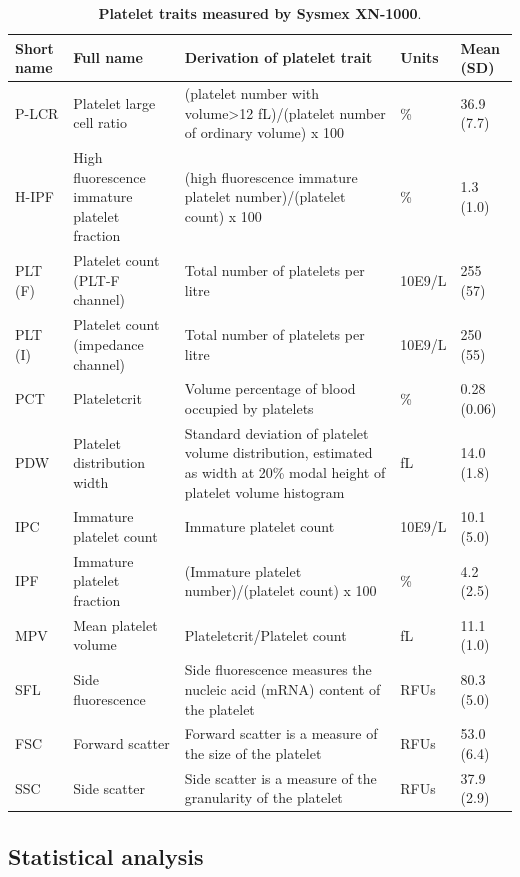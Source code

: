 \documentclass[11pt,twoside]{bristolthesis}
\begin{document}
\begin{landscape}\begin{table}

\caption[Platelet traits measured by Sysmex XN-1000]{\label{tab:Platelet-traits}\textbf{Platelet traits measured by Sysmex XN-1000}.}
\centering
\begin{tabu} to 
\toprule
Short name & Full name & Derivation of platelet trait & Units & Mean (SD)\\
\midrule
P-LCR & Platelet large cell ratio & (platelet number with volume>12 fL)/(platelet number of ordinary volume)  x 100 & \% & 36.9 (7.7)\\
H-IPF & High fluorescence immature platelet fraction & (high fluorescence immature platelet number)/(platelet count)  x 100 & \% & 1.3 (1.0)\\
PLT (F) & Platelet count (PLT-F channel) & Total number of platelets per litre & 10E9/L & 255 (57)\\
PLT (I) & Platelet count (impedance channel) & Total number of platelets per litre & 10E9/L & 250 (55)\\
PCT & Plateletcrit & Volume percentage of blood occupied by platelets & \% & 0.28 (0.06)\\
\addlinespace
PDW & Platelet distribution width & Standard deviation of platelet volume distribution, estimated as width at 20\% modal height of platelet volume histogram & fL & 14.0 (1.8)\\
IPC & Immature platelet count & Immature platelet count & 10E9/L & 10.1 (5.0)\\
IPF & Immature platelet fraction & (Immature platelet number)/(platelet count)   x 100 & \% & 4.2 (2.5)\\
MPV & Mean platelet volume & Plateletcrit/Platelet count & fL & 11.1 (1.0)\\
SFL & Side fluorescence & Side fluorescence measures the nucleic acid (mRNA) content of the platelet & RFUs & 80.3 (5.0)\\
\addlinespace
FSC & Forward scatter & Forward scatter is a measure of the size of the platelet & RFUs & 53.0 (6.4)\\
SSC & Side scatter & Side scatter is a measure of the granularity of the platelet & RFUs & 37.9 (2.9)\\
\bottomrule
\end{tabu}
\end{table}
\end{landscape}
\hypertarget{statistical-analysis}{%
\subsection{Statistical analysis}\label{statistical-analysis}}
\end{document}

